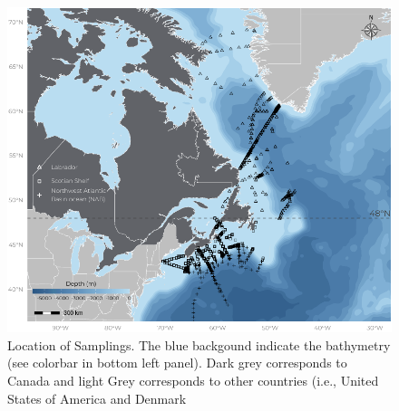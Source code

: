 \documentclass[utf8]{frontiersSCNS} %
\begin{document}
\begin{figure}[h!]
\begin{center}
\includegraphics[width=16cm]{fig01.pdf}%
\end{center}
\caption{Location of Samplings. The blue backgound indicate the bathymetry (see colorbar in bottom left panel). Dark grey corresponds to Canada and light Grey corresponds to other countries (i.e., United States of America and Denmark}\label{fig:1}
\end{figure}
\end{document}
